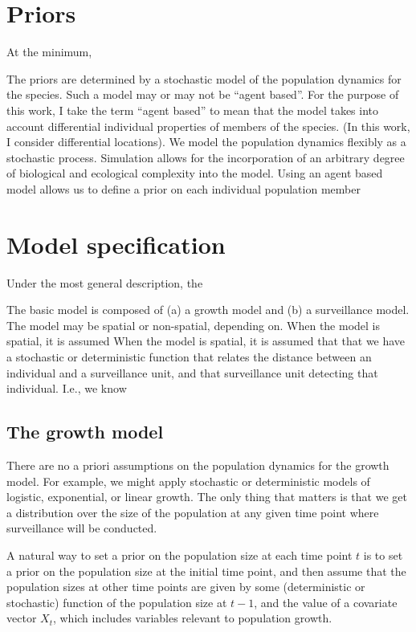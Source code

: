 \documentclass[
]{book}
\begin{document}
\hypertarget{priors}{%
\section{Priors}\label{priors}}

At the minimum,

The priors are determined by a stochastic model of the population dynamics for the species. Such a model may or may not be ``agent based''. For the purpose of this work, I take the term ``agent based'' to mean that the model takes into account differential individual properties of members of the species. (In this work, I consider differential locations). We model the population dynamics flexibly as a stochastic process. Simulation allows for the incorporation of an arbitrary degree of biological and ecological complexity into the model. Using an agent based model allows us to define a prior on each individual population member

\hypertarget{model-specification-1}{%
\section{Model specification}\label{model-specification-1}}

Under the most general description, the

The basic model is composed of (a) a growth model and (b) a surveillance model. The model may be spatial or non-spatial, depending on. When the model is spatial, it is assumed When the model is spatial, it is assumed that that we have a stochastic or deterministic function that relates the distance between an individual and a surveillance unit, and that surveillance unit detecting that individual. I.e., we know

\hypertarget{the-growth-model}{%
\subsection{The growth model}\label{the-growth-model}}

There are no a priori assumptions on the population dynamics for the growth model. For example, we might apply stochastic or deterministic models of logistic, exponential, or linear growth. The only thing that matters is that we get a distribution over the size of the population at any given time point where surveillance will be conducted.

A natural way to set a prior on the population size at each time point \(t\) is to set a prior on the population size at the initial time point, and then assume that the population sizes at other time points are given by some (deterministic or stochastic) function of the population size at \(t-1\), and the value of a covariate vector \(X_t\), which includes variables relevant to population growth.
\end{document}
